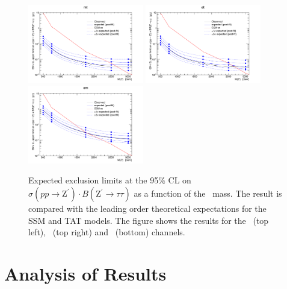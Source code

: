 \begin{figure}[ht]
\begin{center}
\captionsetup[subfloat]{farskip=0pt,captionskip=0.0cm,labelformat=empty}
  \includegraphics[clip,width=0.45\textwidth]{figuras/Conclusions/mt.pdf}
  \includegraphics[clip,width=0.45\textwidth]{figuras/Conclusions/et.pdf}\hfill
  \includegraphics[clip,width=0.45\textwidth]{figuras/Conclusions/em.pdf}	
\end{center}
\caption{Expected exclusion limits at the 95$\%$ CL on $\sigma (pp\rightarrow\textrm{Z}^{\prime}) \cdot B(\textrm{Z}^{\prime}\rightarrow\tau\tau)$ as 
a function of the \Zprime~mass. The result is compared with the leading order theoretical expectations for the SSM and TAT models. The figure 
shows the results for the \tauh\taumu~(top left), \tauh\taue~(top right) and \taue\taumu~(bottom) channels.}
\label{fig:ExclusionLimits}
\end{figure}

\section{Analysis of Results}
\label{AnalysisResults}

